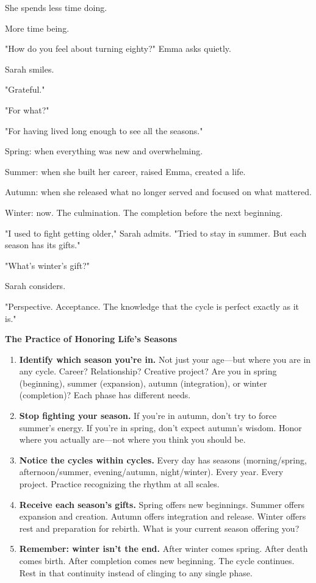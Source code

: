 \documentclass[11pt,twoside]{book}
\begin{document}
She spends less time doing.

More time being.

"How do you feel about turning eighty?" Emma asks quietly.

Sarah smiles.

"Grateful."

"For what?"

"For having lived long enough to see all the seasons."

Spring: when everything was new and overwhelming.

Summer: when she built her career, raised Emma, created a life.

Autumn: when she released what no longer served and focused on what mattered.

Winter: now. The culmination. The completion before the next beginning.

"I used to fight getting older," Sarah admits. "Tried to stay in summer. But each season has its gifts."

"What's winter's gift?"

Sarah considers.

"Perspective. Acceptance. The knowledge that the cycle is perfect exactly as it is."

\begin{practicebox}
\textbf{The Practice of Honoring Life's Seasons}

\begin{enumerate}
\item \textbf{Identify which season you're in.} Not just your age—but where you are in any cycle. Career? Relationship? Creative project? Are you in spring (beginning), summer (expansion), autumn (integration), or winter (completion)? Each phase has different needs.

\item \textbf{Stop fighting your season.} If you're in autumn, don't try to force summer's energy. If you're in spring, don't expect autumn's wisdom. Honor where you actually are—not where you think you should be.

\item \textbf{Notice the cycles within cycles.} Every day has seasons (morning/spring, afternoon/summer, evening/autumn, night/winter). Every year. Every project. Practice recognizing the rhythm at all scales.

\item \textbf{Receive each season's gifts.} Spring offers new beginnings. Summer offers expansion and creation. Autumn offers integration and release. Winter offers rest and preparation for rebirth. What is your current season offering you?

\item \textbf{Remember: winter isn't the end.} After winter comes spring. After death comes birth. After completion comes new beginning. The cycle continues. Rest in that continuity instead of clinging to any single phase.
\end{enumerate}
\end{practicebox}
\end{document}
